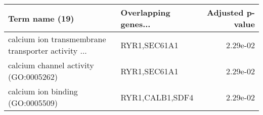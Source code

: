 \begin{tabular}{llr}
\toprule
                                    Term name (19) & Overlapping genes... &  Adjusted p-value \\
\midrule
calcium ion transmembrane transporter activity ... &         RYR1,SEC61A1 &          2.29e-02 \\
             calcium channel activity (GO:0005262) &         RYR1,SEC61A1 &          2.29e-02 \\
                  calcium ion binding (GO:0005509) &      RYR1,CALB1,SDF4 &          2.29e-02 \\
\bottomrule
\end{tabular}

